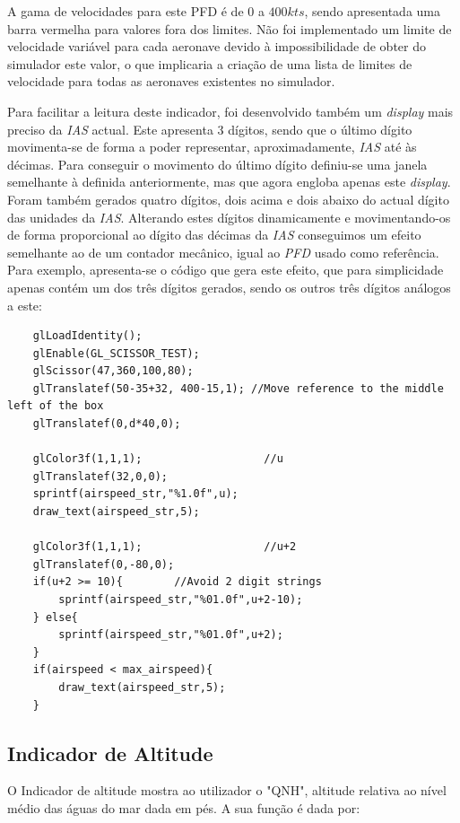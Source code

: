 \documentclass[palatino]{ist-report}
\begin{document}
A gama de velocidades para este PFD é de $0$ a $400kts$, sendo apresentada uma barra vermelha para valores fora dos limites. Não foi implementado um limite de velocidade variável para cada aeronave devido à impossibilidade de obter do simulador este valor, o que implicaria a criação de uma lista de limites de velocidade para todas as aeronaves existentes no simulador.

Para facilitar a leitura deste indicador, foi desenvolvido também um \textit{display} mais preciso da \textit{IAS} actual. Este apresenta 3 dígitos, sendo que o último dígito movimenta-se de forma a poder representar, aproximadamente, \textit{IAS} até às décimas. Para conseguir o movimento do último dígito definiu-se uma janela semelhante à definida anteriormente, mas que agora engloba apenas este \textit{display}. Foram também gerados quatro dígitos, dois acima e dois abaixo do actual dígito das unidades da \textit{IAS}. Alterando estes dígitos dinamicamente e movimentando-os de forma proporcional ao dígito das décimas da \textit{IAS} conseguimos um efeito semelhante ao de um contador mecânico, igual ao \textit{PFD} usado como referência. Para exemplo, apresenta-se o código que gera este efeito, que para simplicidade apenas contém um dos três dígitos gerados, sendo os outros três dígitos análogos a este:
\begin{verbatim}
    glLoadIdentity();
    glEnable(GL_SCISSOR_TEST);
    glScissor(47,360,100,80);
    glTranslatef(50-35+32, 400-15,1); //Move reference to the middle left of the box
    glTranslatef(0,d*40,0);

    glColor3f(1,1,1);                   //u
    glTranslatef(32,0,0);
    sprintf(airspeed_str,"%1.0f",u);
    draw_text(airspeed_str,5);

    glColor3f(1,1,1);                   //u+2
    glTranslatef(0,-80,0);
    if(u+2 >= 10){        //Avoid 2 digit strings
        sprintf(airspeed_str,"%01.0f",u+2-10);
    } else{
        sprintf(airspeed_str,"%01.0f",u+2);
    }
    if(airspeed < max_airspeed){
        draw_text(airspeed_str,5);
    }
\end{verbatim}


\subsection{Indicador de Altitude}

O Indicador de altitude mostra ao utilizador o "QNH", altitude relativa ao nível médio das águas do mar dada em pés. A sua função é dada por:
\end{document}
